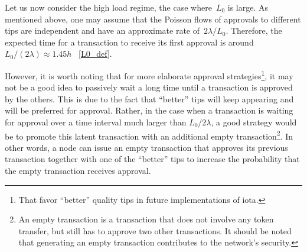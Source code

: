\documentclass[12pt]{article}
\begin{document}
Let us now consider the high load regime, 
the 
case where~$L_0$ is large.
As mentioned above, one may assume that
the Poisson flows of approvals to different tips are independent
and have an approximate rate of~$2\lambda/L_0$. Therefore,
 the expected time for a transaction to 
receive its first approval is around $L_0/(2\lambda)\approx 1.45 h$
~\eqref{L0_def}.

However, 
it is worth noting that for more elaborate
approval strategies\footnote{That favor 
``better'' quality tips in future implementations of iota.}, it may not be a good
idea to passively wait a long time until a transaction
is approved by the others. 
This is 
due to the fact that ``better'' tips will
keep appearing and will be preferred for approval.
Rather, in the case when a transaction is waiting 
for approval over 
a time interval much larger than $L_0/2\lambda$,
a good strategy 
would be 
to promote this latent transaction with an additional empty 
transaction\footnote{An empty transaction is a transaction
that does not involve any token transfer, but still has to
approve two other transactions. It should be noted that 
generating an 
empty transaction contributes 
to the network's security.}. 
In other words, a node can issue an empty transaction that 
approves its previous transaction together with one of the ``better'' tips to 
increase the probability that the empty transaction receives approval.
\end{document}
